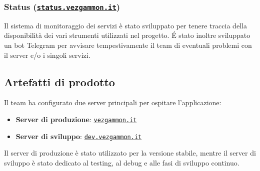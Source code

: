\documentclass{article}
\begin{document}
\subsubsection{Status (\href{https://status.vezgammon.it}{\texttt{status.vezgammon.it}})}
Il sistema di monitoraggio dei servizi è stato sviluppato per tenere traccia della disponibilità dei vari strumenti utilizzati nel progetto. 
\'E stato inoltre sviluppato un bot Telegram per avvisare tempestivamente il team di eventuali problemi con il server e/o i singoli servizi.

\subsection{Artefatti di prodotto}

Il team ha configurato due server principali per ospitare l'applicazione:
\begin{itemize}
    \item \textbf{Server di produzione}: \href{https://vezgammon.it}{\texttt{vezgammon.it}}
    \item \textbf{Server di sviluppo}: \href{https://dev.vezgammon.it}{\texttt{dev.vezgammon.it}}
\end{itemize}
Il server di produzione è stato utilizzato per la versione stabile, mentre il server di sviluppo è stato dedicato al testing, al debug e alle fasi di sviluppo continuo.
\end{document}
